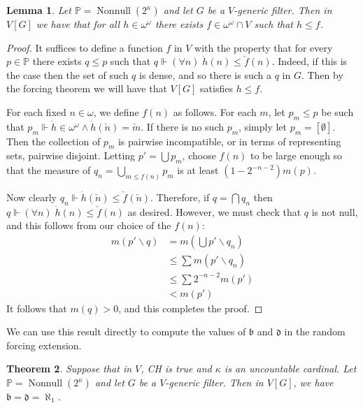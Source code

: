 \documentclass[11pt,oneside]{amsbook}
\newcommand{\PP}{\mathbb P}
\newcommand{\forces}{\Vdash}
\DeclareMathOperator{\Nonnull}{Nonnull}
\theoremstyle{definition}
\theoremstyle{plain}
\newtheorem{theorem}{Theorem}[section]
\newtheorem{lemma}[theorem]{Lemma}
\theoremstyle{definition}
\theoremstyle{remark}
\numberwithin{equation}{section}
\numberwithin{figure}{section}
\begin{document}
\begin{lemma}
  Let $\PP=\Nonnull(2^\kappa)$ and let $G$ be a $V$-generic filter. Then in $V[G]$ we have that for all $h\in\omega^\omega$ there exists $f\in \omega^\omega\cap V$ such that $h\leq f$.
\end{lemma}

\begin{proof}
  It suffices to define a function $f$ in $V$ with the property that for every $p\in\PP$ there exists $q\leq p$ such that $q\forces(\forall n)\;\dot h(n)\leq\check f(n)$. Indeed, if this is the case then the set of such $q$ is dense, and so there is such a $q$ in $G$. Then by the forcing theorem we will have that $V[G]$ satisfies $h\leq f$.
  
  For each fixed $n\in\omega$, we define $f(n)$ as follows. For each $m$, let $p_m\leq p$ be such that $p_m\forces\dot h\in\omega^\omega\wedge\dot h(\check n)=\check m$. If there is no such $p_m$, simply let $p_m=[\emptyset]$. Then the collection of $p_m$ is pairwise incompatible, or in terms of representing sets, pairwise disjoint. Letting $p'=\bigcup p_m$, choose $f(n)$ to be large enough so that the measure of $q_n=\bigcup_{m\leq f(n)}p_m$ is at least $(1-2^{-n-2})m(p)$.

  Now clearly $q_n\forces\dot h(\check n)\leq\check f(\check n)$. Therefore, if $q=\bigcap q_n$ then $q\forces(\forall n)\;\dot h(n)\leq\check f(n)$ as desired. However, we must check that $q$ is not null, and this follows from our choice of the $f(n)$:
  \begin{align*}
    m(p'\smallsetminus q)&=m(\bigcup p'\smallsetminus q_n)\\
                        &\leq\sum m(p'\smallsetminus q_n)\\
                        &\leq\sum 2^{-n-2}m(p')\\
                        &<m(p')
  \end{align*}
  It follows that $m(q)>0$, and this completes the proof.
\end{proof}

We can use this result directly to compute the values of $\mathfrak b$ and $\mathfrak d$ in the random forcing extension.

\begin{theorem}
  \label{thm:random-bd}
  Suppose that in $V$, CH is true and $\kappa$ is an uncountable cardinal. Let $\PP=\Nonnull(2^\kappa)$ and let $G$ be a $V$-generic filter. Then in $V[G]$, we have $\mathfrak b=\mathfrak d=\aleph_1$.
\end{theorem}
\end{document}
